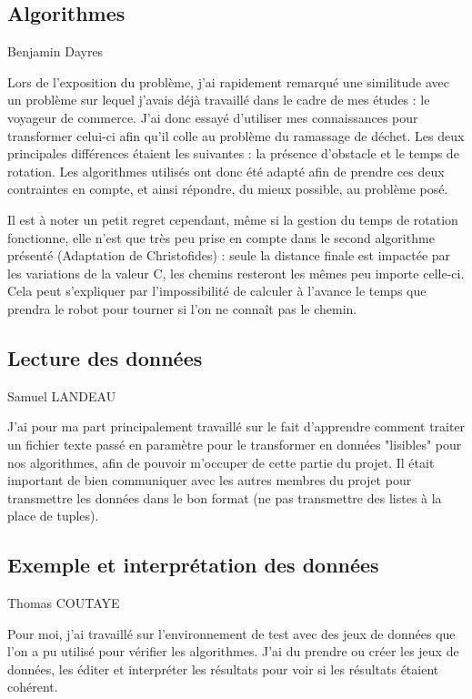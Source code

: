 \documentclass{article}
\begin{document}
\subsection{Algorithmes}
Benjamin Dayres

Lors de l'exposition du problème, j'ai rapidement remarqué une similitude avec un problème sur lequel j'avais déjà travaillé dans le cadre de mes études : le voyageur de commerce.
J'ai donc essayé d'utiliser mes connaissances pour transformer celui-ci afin qu'il colle au problème du ramassage de déchet. Les deux principales différences étaient les suivantes : la présence d'obstacle et le temps de rotation.
Les algorithmes utilisés ont donc été adapté afin de prendre ces deux contraintes en compte, et ainsi répondre, du mieux possible, au problème posé. \newline

Il est à noter un petit regret cependant, même si la gestion du temps de rotation fonctionne, elle n'est que très peu prise en compte dans le second algorithme présenté (Adaptation de Christofides) : seule la distance finale est impactée par les variations de la valeur C, les chemins resteront les mêmes peu importe celle-ci. Cela peut s'expliquer par l'impossibilité de calculer à l'avance le temps que prendra le robot pour tourner si l'on ne connaît pas le chemin.

\subsection{Lecture des données}
Samuel LANDEAU

J'ai pour ma part principalement travaillé sur le fait d'apprendre comment traiter un fichier texte passé en paramètre pour le transformer en données
"lisibles" pour nos algorithmes, afin de pouvoir m'occuper de cette partie du projet. Il était important de bien communiquer avec les autres membres du 
projet pour transmettre les données dans le bon format (ne pas transmettre des listes à la place de tuples).

\subsection{Exemple et interprétation des données}
Thomas COUTAYE

Pour moi, j'ai travaillé sur l'environnement de test avec des jeux de données que l'on a pu utilisé pour vérifier les algorithmes.
J'ai du prendre ou créer les jeux de données, les éditer et interpréter les résultats pour voir si les résultats étaient cohérent.
\end{document}
